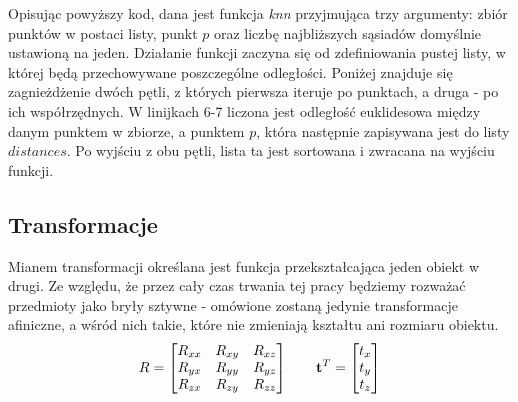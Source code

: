 \documentclass{article}
\begin{document}
\begin{comment}
Chcąc znaleźć najlepsze dopasowanie między dwoma zbiorami punktów potrzebujemy miary tego dopasowania. W tym celu posługujemy sumą odległości korespondujących punktów w metryce euklidesowej. Jeśli przyjmiemy, że po pomiarze odległości danego punktu - staje się on odwiedzony, taką metodę możemy rozpatrywać posługując się terminologią typową dla teorii grafów. Podany algorytm da się rozpisać w postaci listy kroków.

\begin{enumerate}
\item Ustawienie statutu wszystkich punktów jako nieodwiedzone.
\item Wybranie jednego z nich i zmierzenie odległości między nim a punktem $p$.
\item Znalezienie najkrótszej odległości między 
\end{enumerate}
\end{comment}



Opisując powyższy kod, dana jest funkcja \emph{knn} przyjmująca trzy argumenty: zbiór punktów w postaci listy, punkt $p$ oraz liczbę najbliższych sąsiadów domyślnie ustawioną na jeden. Działanie funkcji zaczyna się od zdefiniowania pustej listy, w której będą przechowywane poszczególne odległości. Poniżej znajduje się zagnieżdżenie dwóch pętli, z których pierwsza iteruje po punktach, a druga - po ich współrzędnych. W linijkach 6-7 liczona jest odległość euklidesowa między danym punktem w zbiorze, a punktem $p$, która następnie zapisywana jest do listy $distances$. Po wyjściu z obu pętli, lista ta jest sortowana i zwracana na wyjściu funkcji.

\begin{comment}
Wspomniane algorytmy wyznaczenia najbliższego punktu mogą być rozwinięte do przestrzeni \emph{n}-wymiarowych. Aby dokonać takiej generalizacji do przestrzeni trójwymiarowej konieczne jest zastosowanie macierzy obrotu - rotacji \textbf{R} i wektora przesunięcia liniowego - translacji $\vb{t}$.
\end{comment}

\subsection{\LARGE{Transformacje}}
Mianem transformacji określana jest funkcja przekształcająca jeden obiekt w drugi. Ze względu, że przez cały czas trwania tej pracy będziemy rozważać przedmioty jako bryły sztywne - omówione zostaną jedynie transformacje afiniczne, a wśród nich takie, które nie zmieniają kształtu ani rozmiaru obiektu. 
\[
R = \begin{bmatrix}
R_{xx} & R_{xy} & R_{xz} \\
R_{yx} & R_{yy} & R_{yz} \\
R_{zx} & R_{zy} & R_{zz}
\end{bmatrix}
\qquad
\vb{t}^T = \begin{bmatrix}
t_{x} \\ t_{y} \\ t_{z}
\end{bmatrix}
\]
\end{document}
